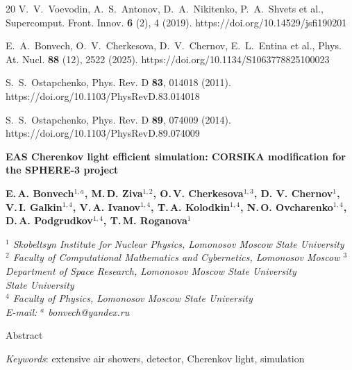 \documentclass[aps,preprint,showpacs,aps,amsmath,showkeys,nobibnotes,nofootinbib,footnotes,superscriptaddress]{revtex4-2}
\begin{document}
\begin{thebibliography}{20}
V.~V.~Voevodin, A.~S.~Antonov, D.~A.~Nikitenko, P.~A.~Shvets et al., Supercomput. Front. Innov. \textbf{6} (2), 4 (2019).
https://doi.org/10.14529/jsfi190201


E.~A.~Bonvech, O.~V.~Cherkesova, D.~V.~Chernov, E.~L.~Entina et al., Phys. At. Nucl. \textbf{88} (12), 2522 (2025).
https://doi.org/10.1134/S1063778825100023

S.~S.~Ostapchenko, Phys. Rev. D \textbf{83}, 014018 (2011).
\\ https://doi.org/10.1103/PhysRevD.83.014018


S.~S.~Ostapchenko, Phys. Rev. D \textbf{89}, 074009 (2014).\\
https://doi.org/10.1103/PhysRevD.89.074009

\end{thebibliography}
	
	
	
	\newpage
	\begin{center}
		\textbf{EAS Cherenkov light efficient simulation: CORSIKA modification for the SPHERE-3 project}
		
		\medskip\small
		
		\textbf{E.\,A. Bonvech$^{1,a}$, M.\,D. Ziva$^{1,2}$, O.\,V. Cherkesova$^{1,3}$, D. V. Chernov$^{1}$, V.\,I. Galkin$^{1,4}$, V.\,A. Ivanov$^{1,4}$, T.\,A. Kolodkin$^{1,4}$, N.\,O. Ovcharenko$^{1,4}$, D.\,A. Podgrudkov$^{1,4}$, T.\,M. Roganova$^1$}
		
		\smallskip
		
		\textit{$^1$ Skobeltsyn Institute for Nuclear Physics, Lomonosov Moscow State University}\\
		\textit{$^2$ Faculty of Computational Mathematics and Cybernetics, Lomonosov Moscow 
        \textit{$^3$ Department of Space Research, Lomonosov Moscow State University}\\
		State University}\\
        \textit{$^4$ Faculty of Physics, Lomonosov Moscow State University}\\
        
		\textit {E-mail: $^a$ bonvech@yandex.ru}
		
		\medskip
		Abstract
		\smallskip
		
		\textit{Keywords}: extensive air showers, detector, Cherenkov light, simulation\\
		
		
	\end{center}
	
	
\end{document}
